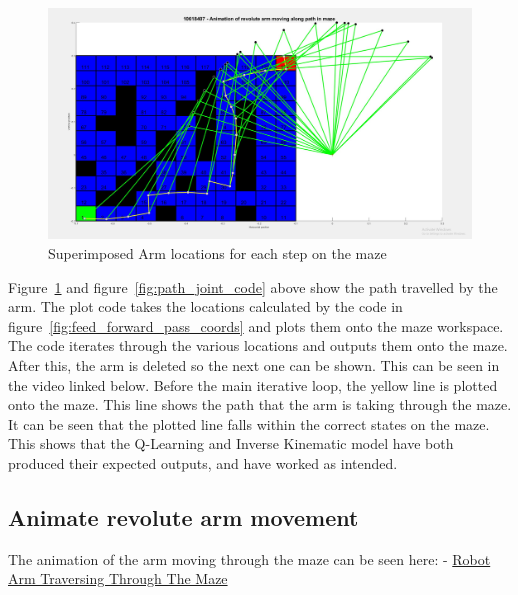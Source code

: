\documentclass [11pt]{article}
\begin{document}
\begin{figure}[H]
\centerline{\includegraphics[width=15cm]{arm_moving-through_workspace}}
\caption{Superimposed Arm locations for each step on the maze}
\label{fig:arm_locations_on_maze}
\end{figure}

Figure~\ref{fig:arm_locations_on_maze} and figure~\ref{fig:path_joint_code} above show the path travelled by the arm. The plot code takes the locations calculated by the code in figure~\ref{fig:feed_forward_pass_coords} and plots them onto the maze workspace. The code iterates through the various locations and outputs them onto the maze. After this, the arm is deleted so the next one can be shown. This can be seen in the video linked below. Before the main iterative loop, the yellow line is plotted onto the maze. This line shows the path that the arm is taking through the maze. It can be seen that the plotted line falls within the correct states on the maze. This shows that the Q-Learning and Inverse Kinematic model have both produced their expected outputs, and have worked as intended. 

\subsection{Animate revolute arm movement} 

The animation of the arm moving through the maze can be seen here: - \href{https://youtu.be/_ZtAD1VYlzo}{Robot Arm Traversing Through The Maze}
\end{document}
